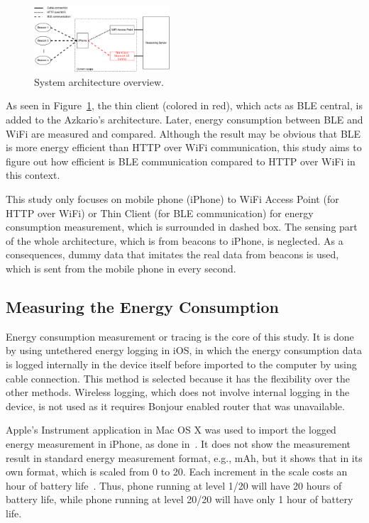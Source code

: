 \documentclass[journal]{vgtc}                %
\begin{document}
\begin{figure}
  \centering
    \includegraphics[width=0.45\textwidth]{system-architecture}
  \caption{System architecture overview.}
  \label{fig:system-architecture}
\end{figure}

As seen in Figure~\ref{fig:system-architecture}, the thin client (colored in red), which acts as BLE central, is added to the Azkario's architecture. Later, energy consumption between BLE and WiFi are measured and compared. Although the result may be obvious that BLE is more energy efficient than HTTP over WiFi communication, this study aims to figure out how efficient is BLE communication compared to HTTP over WiFi in this context.

This study only focuses on mobile phone (iPhone) to WiFi Access Point (for HTTP over WiFi) or Thin Client (for BLE communication) for energy consumption measurement, which is surrounded in dashed box. The sensing part of the whole architecture, which is from beacons to iPhone, is neglected. As a consequences, dummy data that imitates the real data from beacons is used, which is sent from the mobile phone in every second.

\subsection{Measuring the Energy Consumption} %
\label{sub:tracing_}
Energy consumption measurement or tracing is the core of this study. It is done by using untethered energy logging in iOS, in which the energy consumption data is logged internally in the device itself before imported to the computer by using cable connection. This method is selected because it has the flexibility over the other methods. Wireless logging, which does not involve internal logging in the device, is not used as it requires Bonjour enabled router that was unavailable.

Apple's Instrument application in Mac OS X was used to import the logged energy measurement in iPhone, as done in~\cite{Conte2014}. It does not show the measurement result in standard energy measurement format, e.g., mAh, but it shows that in its own format, which is scaled from 0 to 20. Each increment in the scale costs an hour of battery life~\cite{Lucchesi2014}. Thus, phone running at level 1/20 will have 20 hours of battery life, while phone running at level 20/20 will have only 1 hour of battery life.
\end{document}
